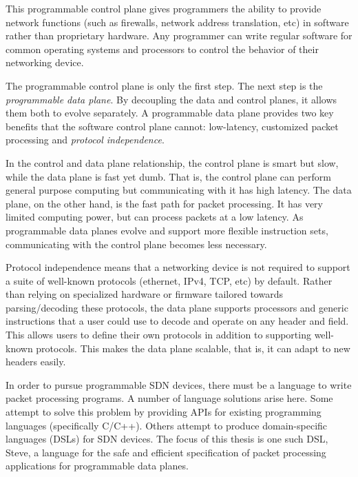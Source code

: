 This programmable control plane gives programmers the ability to
provide network functions (such as firewalls, network address translation, etc) in 
software rather than proprietary hardware.
Any programmer can write regular software for common operating
systems and processors to control the behavior of their networking device.

The programmable control plane is only the first step. The next
step is the \emph{programmable data plane}. By decoupling the data and control planes, it allows them both to evolve separately. A programmable data plane provides
two key benefits that the software control plane cannot: low-latency, customized packet processing and \emph{protocol independence}.

In the control and data plane relationship,
the control plane is smart but slow, while the data plane is fast yet dumb. That is,
the control plane can perform general purpose computing but communicating with
it has high latency. The data plane, on the other hand, is the fast path for packet processing.
It has very limited computing power, but can process packets at a low latency.
As programmable data planes evolve and support more flexible instruction sets,
communicating with the control plane becomes less necessary.

Protocol independence means that a networking device is not required to support
a suite of well-known protocols (ethernet, IPv4, TCP, etc) by default.
Rather than relying on specialized hardware or firmware tailored towards parsing/decoding
these protocols, the data plane supports processors
and generic instructions that a user could use to decode and operate on
any header and field.
This allows users to define their own protocols in addition to
supporting well-known protocols. This makes the data plane scalable, that is, it
can adapt to new headers easily.

In order to pursue programmable SDN devices, there must be a language to write
packet processing programs. A number of language solutions arise here.
Some attempt to solve this problem by providing APIs for existing programming languages
(specifically C/C++).
Others attempt to produce domain-specific languages (DSLs) for SDN devices.
The focus of this thesis is one such DSL, Steve, a language for the safe and
efficient specification of packet processing applications for programmable data planes.



